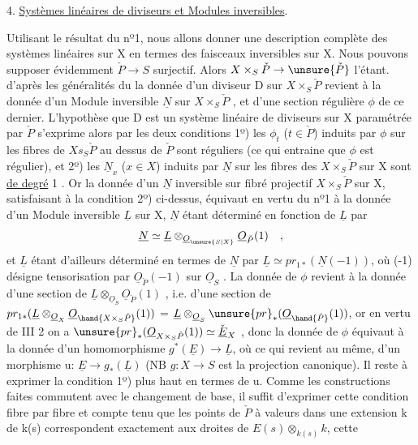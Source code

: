 
4. \uline{Systèmes linéaires de diviseurs et Modules inversibles}.

Utilisant le résultat du nº1, nous allons donner une description
complète des systèmes linéaires sur X en termes des faisceaux inversibles
sur X. Nous pouvons supposer évidemment $\check{P}\to S$ surjectif. Alors $X\times_S\check{P}\to \unsure{\check{P}}$ l'étant.  d'après les généralités du  la donnée d'un
diviseur  D sur $X\times_S\check{P}$  revient à la
donnée d'un Module inversible $\underline{N}$ sur $X\times_S\check{P}$ , et d'une section régulière
$\phi$ de ce dernier.  L'hypothèse que D est un système linéaire de
diviseurs sur X paramétrée par $\check{P}$ s'exprime alors par les deux conditions
1º) les $\phi_t$ ($t\in\check{P}$) induits par $\phi$ sur les fibres de $Xs_S\check{P}$ au dessus de $\check{P}$
sont réguliers (ce qui entraine que $\phi$ est régulier), et 2º) les $\underline{N}_x$ ($x\in X$)
induits par $\underline{N}$  sur les fibres des $X\times_S\check{P}$ sur X sont \uline{de degré} 1 .
Or la donnée d'un $\underline{N}$ inversible sur  fibré projectif $X\times_S\check{P}$ sur X,
satisfaisant à la condition 2º) ci-dessus, équivaut en vertu du nº1
à la donnée d'un Module inversible $\underline{L}$ sur X, $\underline{N}$ étant déterminé en fonction
de $\underline{L}$ par
\[ \underline{N}\simeq\underline{L}\otimes_{\underline{O}_{\unsure{S|X}}}\underline{O}_{\check{P}}(1) \quad , \]
et $\underline{L}$ étant d'ailleurs déterminé en termes de $\underline{N}$ par $\underline{L}\simeq pr_{1*}(\underline{N}(-1))$,
où (-1) désigne  tensorisation par $\underline{O}_{\check{P}}(-1)$ sur $\underline{O}_S$ . La donnée de $\phi$
revient à la donnée d'une section de $\underline{L}\otimes_{\underline{O}_S}\underline{O}_{\check{P}}(1)$ , i.e. d'une section
de $pr_{1*}(\underline{L}\otimes_{\underline{O}_X}\underline{O}_{\hand{X\times_S\check{P}}}(1))$ = $\underline{L}\otimes_{\underline{O}_S}\unsure{pr}_*(\underline{O}_{\hand{\check{P}}}(1))$, 
 or en vertu de III 2 on a $\unsure{pr}_*(\underline{O}_{X\times_S\check{P}}(1))\simeq\check{\underline{E}}_X$ , donc
la donnée de $\phi$ équivaut à  la donnée d'un homomorphisme $g^*(\underline{E})\to\underline{L}$,
où ce qui revient au même, d'un morphisme u: $\underline{E}\to g_*(\underline{L})$ (NB $g:X\to S$ est
la projection canonique). Il reste à exprimer la condition 1º) plus
haut en termes de u. Comme les constructions faites commutent avec le
changement de base, il suffit d'exprimer cette condition fibre par fibre\hand{,}
et compte tenu que les points de $\check{P}$ à valeurs dans une extension k de
k(s) correspondent exactement aux droites de $E(s)\otimes_{k(s)}k$, cette

